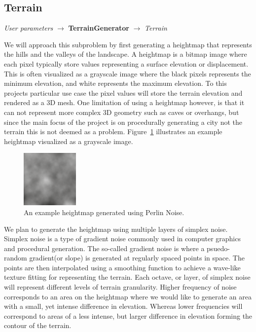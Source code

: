\subsection{Terrain}
\begin{center}
  \textit{User parameters} $\rightarrow$ \textbf{TerrainGenerator}  $\rightarrow$ \textit{Terrain}
\end{center}

We will approach this subproblem by first generating a heightmap that represents the hills and the valleys of the landscape.
A heightmap is a bitmap image where each pixel typically store values representing a surface elevation or displacement.
This is often visualized as a grayscale image where the black pixels represents the minimum elevation, and white represents the maximum elevation.
To this projects particular use case the pixel values will store the terrain elevation and rendered as a 3D mesh.
One limitation of using a heightmap however, is that it can not represent more complex 3D geometry such as caves or overhangs, but since the main focus of the project is on procedurally generating a city not the terrain this is not deemed as a problem.
Figure~\ref{fig:heightmap} illustrates an example heightmap visualized as a grayscale image.

\begin{figure}[h]
  \centering
  \includegraphics[width=0.25\textwidth]{figure/heightmap.png}
  \caption{An example heightmap generated using Perlin Noise.}
  \label{fig:heightmap}
\end{figure}

We plan to generate the heightmap using multiple layers of simplex noise.
Simplex noise is a type of gradient noise commonly used in computer graphics and procedural generation.
The so-called gradient noise is where a psuedo-random gradient(or slope) is generated at regularly spaced points in space.
The points are then interpolated using a smoothing function to achieve a wave-like texture fitting for representing the terrain.
Each octave, or layer, of simplex noise will represent different levels of terrain granularity.
Higher frequency of noise corresponds to an area on the heightmap where we would like to generate an area with a small, yet intense difference in elevation.
Whereas lower frequencies will correspond to areas of a less intense, but larger difference in elevation forming the contour of the terrain.

